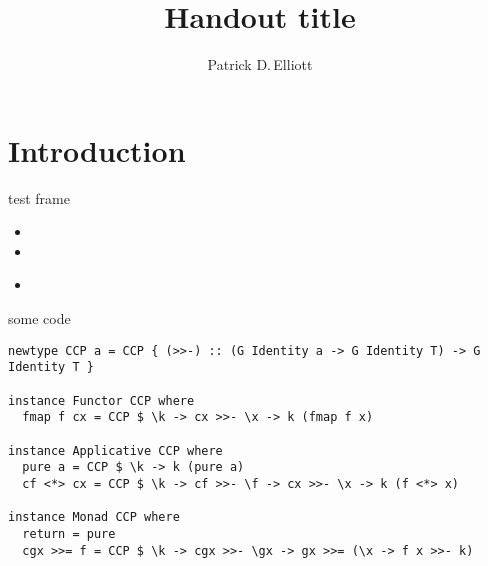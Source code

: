 \documentclass[12pt,paper=a4,DIV=15]{ling-handout}
\title{Handout title}
\author{Patrick D.\,Elliott}
\begin{document}
\maketitle

\section{Introduction}

\begin{frame}{test frame}

\begin{itemize}

\item \kant[1]

\item \kant[2]

\item \citet{fox-sub22,fox2007fc,Fox2007,barLevFox2017,fox_economy_2018}

\end{itemize}

\end{frame}


\begin{frame}{some code}

\begin{verbatim}
newtype CCP a = CCP { (>>-) :: (G Identity a -> G Identity T) -> G Identity T }

instance Functor CCP where
  fmap f cx = CCP $ \k -> cx >>- \x -> k (fmap f x)

instance Applicative CCP where
  pure a = CCP $ \k -> k (pure a)
  cf <*> cx = CCP $ \k -> cf >>- \f -> cx >>- \x -> k (f <*> x)

instance Monad CCP where
  return = pure
  cgx >>= f = CCP $ \k -> cgx >>- \gx -> gx >>= (\x -> f x >>- k)
\end{verbatim}

\end{frame}


\printbibliography

\end{document}
